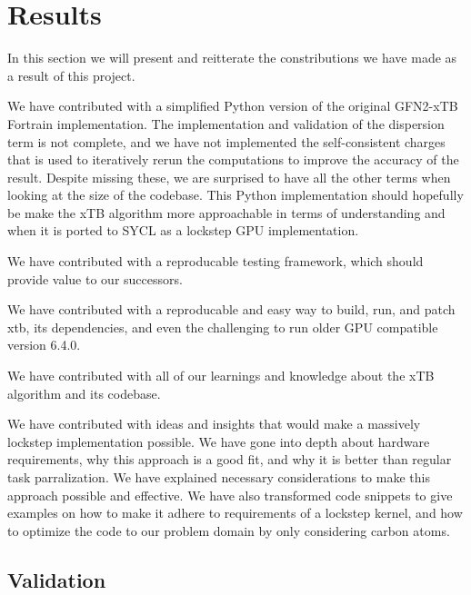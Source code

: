 \chapter{Results}

In this section we will present and reitterate the constributions we have made as a result of this project.

We have contributed with a simplified Python version of the original GFN2-xTB Fortrain implementation. The implementation and validation of the dispersion term is not complete, and we have not implemented the self-consistent charges that is used to iteratively rerun the computations to improve the accuracy of the result. Despite missing these, we are surprised to have all the other terms when looking at the size of the codebase. This Python implementation should hopefully be make the xTB algorithm more approachable in terms of understanding and when it is ported to SYCL as a lockstep GPU implementation.

We have contributed with a reproducable testing framework, which should provide value to our successors.

We have contributed with a reproducable and easy way to build, run, and patch xtb, its dependencies, and even the challenging to run older GPU compatible version 6.4.0.

We have contributed with all of our learnings and knowledge about the xTB algorithm and its codebase.

We have contributed with ideas and insights that would make a massively lockstep implementation possible.
We have gone into depth about hardware requirements, why this approach is a good fit, and why it is better than regular task parralization. We have explained necessary considerations to make this approach possible and effective.
We have also transformed code snippets to give examples on how to make it adhere to requirements of a lockstep kernel, and how to optimize the code to our problem domain by only considering carbon atoms.




\section{Validation}




